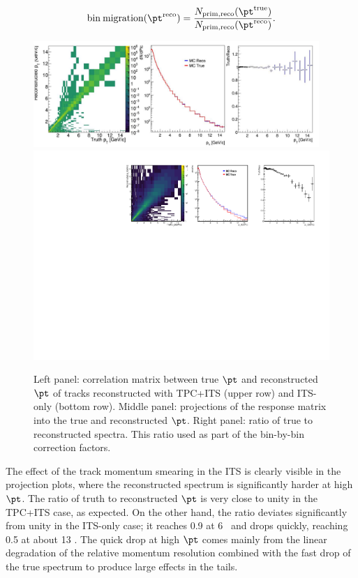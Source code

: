 \begin{equation}\label{eq:bin_migration}
\mathrm{bin\:migration} (\pt^{\mathrm{reco}}) = \frac{N_{\mathrm{prim,reco}}(\pt^{\mathrm{true}})}{N_{\mathrm{prim,reco}}(\pt^{\mathrm{reco}})}.
\end{equation}

\begin{figure}[h!]
\includegraphics[width=0.965\textwidth]{Data_Analysis/Tracking/Matrix_tracking_tpc_MBMC_0GeV15GeV_dNdPt.pdf}\\
\includegraphics[width=1.0\textwidth]{Data_Analysis/Tracking/Matrix_tracking_its_MBMC_0GeV15GeV_dNdPt.pdf}

\caption{Left panel: correlation matrix between true $\pt$ and reconstructed $\pt$ of tracks reconstructed with TPC+ITS (upper row) and ITS-only (bottom row). Middle panel: projections of the response matrix into the true and reconstructed $\pt$. Right panel: ratio of true to reconstructed spectra. This ratio used as part of the bin-by-bin correction factors.}
\label{fig:responseMatrixTPC}
\end{figure}

The effect of the track momentum smearing in the ITS is clearly visible in the projection plots, where the reconstructed spectrum is significantly harder at high $\pt$. The ratio of truth to reconstructed $\pt$ is very close to unity in the TPC+ITS case, as expected. On the other hand, the ratio deviates significantly from unity in the ITS-only case; it reaches 0.9 at 6 \GeVc~and drops quickly, reaching 0.5 at about 13 \GeVc. The quick drop at high $\pt$ comes mainly from the linear degradation of the relative momentum resolution combined with the fast drop of the true spectrum to produce large effects in the tails. 

